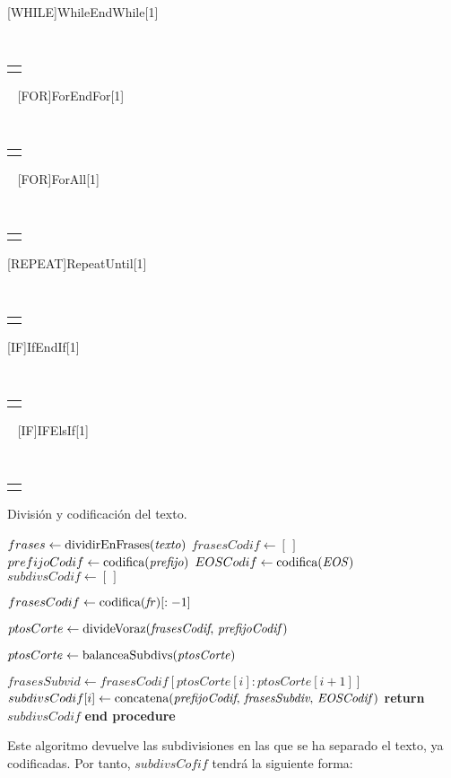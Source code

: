 \newcommand\CONDITION[2]%
{\begin{tabular}[t]{@{}l@{}}
		#1 #2
 \end{tabular}%
}
[WHILE]{While}{EndWhile}[1]%
{\algorithmicwhile\ \CONDITION{#1}{\ \algorithmicdo}}%
{\algorithmicend\ \algorithmicwhile}
[FOR]{For}{EndFor}[1]%
{\algorithmicfor\ \CONDITION{#1}{\ \algorithmicdo}}%
{\algorithmicend\ \algorithmicfor}
[FOR]{ForAll}[1]%
{\algorithmicforall\ \CONDITION{#1}{\ \algorithmicdo}}
[REPEAT]{Repeat}{Until}{\algorithmicrepeat}[1]%
{\algorithmicuntil\ \CONDITION{#1}{}}
[IF]{If}{EndIf}[1]%
{\algorithmicif\ \CONDITION{#1}{\ \algorithmicthen}}%
{\algorithmicend\ \algorithmicif}%
[IF]{IF}{ElsIf}[1]%
{\algorithmicelse\ \algorithmicif\ \CONDITION{#1}{\ \algorithmicthen}}
\begin{algorithm}
	\caption{División y codificación del texto.}\label{alg:division-codificacion}
	\begin{algorithmic}[1]
		\State $frases \gets \text{dividirEnFrases(\textit{texto})}$
		\State $frasesCodif \gets [\,]$ 
		\State $prefijoCodif \gets \text{codifica(\textit{prefijo})}$
		\State $EOSCodif \gets \text{codifica(\textit{EOS})}$ 
		\State $subdivsCodif \gets [\,]$ 
		
			\State $frasesCodif \gets \text{codifica(\textit{fr})}[:-1]$ 
		\EndFor
		
		\State $ptosCorte \gets \text{divideVoraz(\textit{frasesCodif}, \textit{prefijoCodif})}$
		
		\State $ptosCorte \gets \text{balanceaSubdivs(\textit{ptosCorte})}$

			\State $frasesSubvid \gets frasesCodif[ptosCorte[i]:ptosCorte[i+1]]$ 
			\State $subdivsCodif[i] \gets \text{concatena(\textit{prefijoCodif}, \textit{frasesSubdiv}, \textit{EOSCodif})}$
		\EndFor
		\State \textbf{return} $subdivsCodif$
		\State \hspace{-0.5cm}\textbf{end procedure}
		\EndProcedure
	\end{algorithmic}
\end{algorithm}

Este algoritmo devuelve las subdivisiones en las que se ha separado el texto, ya codificadas. Por tanto, $subdivsCofif$ tendrá la siguiente forma:

